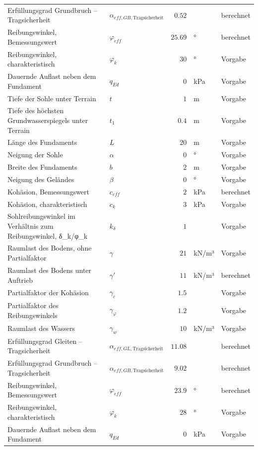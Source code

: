 \documentclass[11pt,a4paper]{article}
\begin{document}
\begin{xltabular}{\linewidth}{>{\raggedright\arraybackslash}Xlrll}
Erfüllungsgrad Grundbruch – Tragsicherheit & $\alpha_{eff,GB,\text{Tragsicherheit}}$ & $0.52$ &  & berechnet \\
Reibungswinkel, Bemessungswert & $\varphi_{eff}$ & $25.69$ & ° & berechnet \\
Reibungswinkel, charakteristisch & $\varphi_k$ & $30$ & ° & Vorgabe \\
Dauernde Auflast neben dem Fundament & $q_{Ed}$ & $0$ & kPa & Vorgabe \\
Tiefe der Sohle unter Terrain & $t$ & $1$ & m & Vorgabe \\
Tiefe des höchsten Grundwasserspiegels unter Terrain & $t_1$ & $0.4$ & m & Vorgabe \\
Länge des Fundaments & $L$ & $20$ & m & Vorgabe \\
Neigung der Sohle & $\alpha$ & $0$ & ° & Vorgabe \\
Breite des Fundaments & $b$ & $2$ & m & Vorgabe \\
Neigung des Geländes & $\beta$ & $0$ & ° & Vorgabe \\
Kohäsion, Bemessungswert & $c_{eff}$ & $2$ & kPa & berechnet \\
Kohäsion, charakteristisch & $c_k$ & $3$ & kPa & Vorgabe \\
Sohlreibungswinkel im Verhältnis zum Reibungswinkel, δ\_k/φ\_k & $k_{\delta}$ & $1$ &  & Vorgabe \\
Raumlast des Bodens, ohne Partialfaktor & $\gamma$ & $21$ & kN/m³ & Vorgabe \\
Raumlast des Bodens unter Auftrieb & $\gamma'$ & $11$ & kN/m³ & berechnet \\
Partialfaktor der Kohäsion & $\gamma_c$ & $1.5$ &  & Vorgabe \\
Partialfaktor des Reibungswinkels & $\gamma_{\varphi}$ & $1.2$ &  & Vorgabe \\
Raumlast des Wassers & $\gamma_w$ & $10$ & kN/m³ & Vorgabe \\
Erfüllungsgrad Gleiten – Tragsicherheit & $\alpha_{eff,GL,\text{Tragsicherheit}}$ & $11.08$ &  & berechnet \\
Erfüllungsgrad Grundbruch – Tragsicherheit & $\alpha_{eff,GB,\text{Tragsicherheit}}$ & $9.02$ &  & berechnet \\
Reibungswinkel, Bemessungswert & $\varphi_{eff}$ & $23.9$ & ° & berechnet \\
Reibungswinkel, charakteristisch & $\varphi_k$ & $28$ & ° & Vorgabe \\
Dauernde Auflast neben dem Fundament & $q_{Ed}$ & $0$ & kPa & Vorgabe \\

\end{xltabular}
\end{document}
